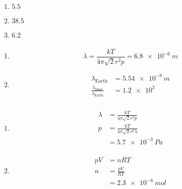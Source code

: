 \documentclass{article}
\begin{document}
\subsubsection{}

\begin{enumerate}
  \item $5.5$

  \item $38.5$

  \item $6.2$
\end{enumerate}

\subsubsection{}

\begin{enumerate}
  \item \[\lambda = \frac{k T}{4 \pi \sqrt{2} r^2 p} = \qty{6.8e-6}{m}\]

  \item

        \begin{align*}
          \lambda_\text{Earth}                             & = \qty{5.54e-8}{m} \\
          \frac{\lambda_\text{Mars}}{\lambda_\text{Earth}} & = \num{1.2e2}
        \end{align*}
\end{enumerate}

\subsubsection{}

\begin{enumerate}
  \item

        \begin{align*}
          \lambda & = \frac{k T}{4 \pi \sqrt{2} r^2 p}       \\
          p       & = \frac{k T}{4 \pi \sqrt{2} r^2 \lambda} \\
                  & = \qty{5.7e-3}{Pa}                       \\
        \end{align*}

  \item

        \begin{align*}
          p V & = n R T             \\
          n   & = \frac{p V}{R T}   \\
              & = \qty{2.3e-6}{mol}
        \end{align*}
\end{enumerate}
\end{document}

